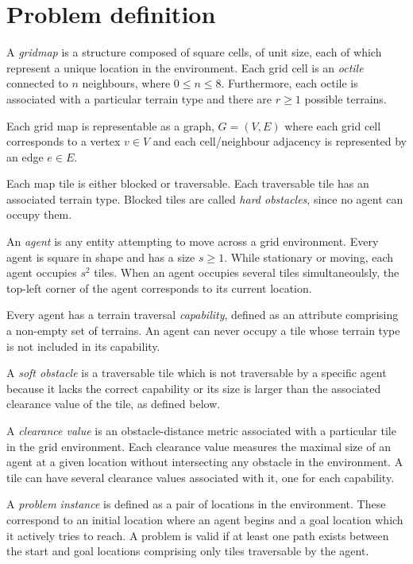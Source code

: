 \section{Problem definition}
A \emph{gridmap} is a structure composed of square cells, of unit size, each of which represent a unique location in the environment. 
Each grid cell is an \emph{octile} connected to $n$ neighbours, where  $0 \leq n \leq 8$. 
Furthermore, each octile is associated with a particular terrain type and there are $r \geq 1$ possible terrains.
\par \indent
Each grid map is representable as a graph, $G = (V, E)$ where each grid cell corresponds to a vertex $v \in V$ and each cell/neighbour adjacency is represented by an edge $e \in E$.
\par \indent
Each map tile is either blocked or traversable. 
Each traversable tile has an associated terrain type. 
Blocked tiles are called \emph{hard obstacles}, since no agent can occupy them.
\par \indent
An \emph{agent} is any entity attempting to move across a grid environment. 
Every agent is square in shape and has a size $s \geq 1$.
While stationary or moving, each agent occupies $s^2$ tiles. 
When an agent occupies several tiles simultaneoulsly, the top-left corner of the agent corresponds to its current location.
\par \indent
Every agent has a terrain traversal \emph{capability}, defined as an attribute comprising a non-empty set of terrains. 
An agent can never occupy a tile whose terrain type is not included in its capability.
\par \indent 
A \emph{soft obstacle} is a traversable tile which is not traversable by a specific agent because it lacks the correct capability or its size is larger than the associated clearance value of the tile, as defined below. 
\par \indent
A \emph{clearance value} is an obstacle-distance metric associated with a particular tile in the grid environment. 
Each clearance value measures the maximal size of an agent at a given location without intersecting any obstacle in the environment. 
A tile can have several clearance values associated with it, one for each capability. 
\par \indent
A \emph{problem instance} is defined as a pair of locations in the environment. These correspond to an initial location where an agent begins and a goal location which it actively tries to reach. A problem is valid if at least one path exists between the start and goal locations comprising only tiles traversable by the agent. 
